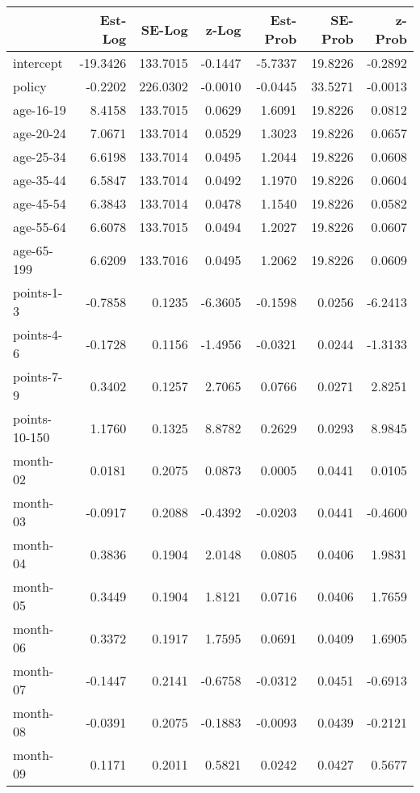 \documentclass[10pt]{article}
\begin{document}
\begin{table}[ht]
\centering
\begin{tabular}{lrrrrrr}
  \hline
 & Est-Log & SE-Log & z-Log & Est-Prob & SE-Prob & z-Prob \\ 
  \hline
intercept & -19.3426 & 133.7015 & -0.1447 & -5.7337 & 19.8226 & -0.2892 \\ 
  policy & -0.2202 & 226.0302 & -0.0010 & -0.0445 & 33.5271 & -0.0013 \\ 
  age-16-19 & 8.4158 & 133.7015 & 0.0629 & 1.6091 & 19.8226 & 0.0812 \\ 
  age-20-24 & 7.0671 & 133.7014 & 0.0529 & 1.3023 & 19.8226 & 0.0657 \\ 
  age-25-34 & 6.6198 & 133.7014 & 0.0495 & 1.2044 & 19.8226 & 0.0608 \\ 
  age-35-44 & 6.5847 & 133.7014 & 0.0492 & 1.1970 & 19.8226 & 0.0604 \\ 
  age-45-54 & 6.3843 & 133.7014 & 0.0478 & 1.1540 & 19.8226 & 0.0582 \\ 
  age-55-64 & 6.6078 & 133.7015 & 0.0494 & 1.2027 & 19.8226 & 0.0607 \\ 
  age-65-199 & 6.6209 & 133.7016 & 0.0495 & 1.2062 & 19.8226 & 0.0609 \\ 
  points-1-3 & -0.7858 & 0.1235 & -6.3605 & -0.1598 & 0.0256 & -6.2413 \\ 
  points-4-6 & -0.1728 & 0.1156 & -1.4956 & -0.0321 & 0.0244 & -1.3133 \\ 
  points-7-9 & 0.3402 & 0.1257 & 2.7065 & 0.0766 & 0.0271 & 2.8251 \\ 
  points-10-150 & 1.1760 & 0.1325 & 8.8782 & 0.2629 & 0.0293 & 8.9845 \\ 
  month-02 & 0.0181 & 0.2075 & 0.0873 & 0.0005 & 0.0441 & 0.0105 \\ 
  month-03 & -0.0917 & 0.2088 & -0.4392 & -0.0203 & 0.0441 & -0.4600 \\ 
  month-04 & 0.3836 & 0.1904 & 2.0148 & 0.0805 & 0.0406 & 1.9831 \\ 
  month-05 & 0.3449 & 0.1904 & 1.8121 & 0.0716 & 0.0406 & 1.7659 \\ 
  month-06 & 0.3372 & 0.1917 & 1.7595 & 0.0691 & 0.0409 & 1.6905 \\ 
  month-07 & -0.1447 & 0.2141 & -0.6758 & -0.0312 & 0.0451 & -0.6913 \\ 
  month-08 & -0.0391 & 0.2075 & -0.1883 & -0.0093 & 0.0439 & -0.2121 \\ 
  month-09 & 0.1171 & 0.2011 & 0.5821 & 0.0242 & 0.0427 & 0.5677 \\ 

\end{tabular}
\end{table}
\end{document}
